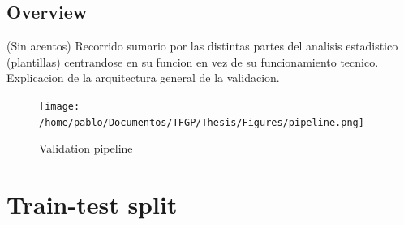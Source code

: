 \subsection{Overview}
(Sin acentos) Recorrido sumario por las distintas partes del analisis estadistico (plantillas) centrandose en su funcion en vez de su funcionamiento tecnico. Explicacion de la arquitectura general de la validacion.\\
%
\begin{figure}[!htb]
	\centering
	\texttt{[image: /home/pablo/Documentos/TFGP/Thesis/Figures/pipeline.png]}
	\caption{Validation pipeline}
	\label{fig:pipeline}
\end{figure}
%
\clearpage
\section{Train-test split}
